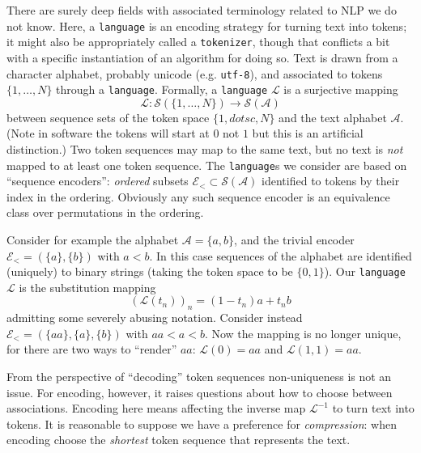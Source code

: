 \documentclass[11pt, oneside]{amsart}   	%
\begin{document}
There are surely deep fields with associated terminology related to NLP we do not know. Here, a \texttt{language} is an encoding strategy for turning text into tokens; it might also be appropriately called a \texttt{tokenizer}, though that conflicts a bit with a specific instantiation of an algorithm for doing so. Text is drawn from a character alphabet, probably unicode (e.g. \texttt{utf-8}), and associated to tokens $\{1,\dotsc,N\}$ through a \texttt{language}. Formally, a \texttt{language} $\mathcal{L}$ is a surjective mapping
\begin{equation*}
	\mathcal{L} : \mathcal{S}(\{1,\dotsc,N\}) \to \mathcal{S}(\mathcal{A})
\end{equation*}
between sequence sets of the token space $\{1,dotsc,N\}$ and the text alphabet $\mathcal{A}$. (Note in software the tokens will start at $0$ not $1$ but this is an artificial distinction.) Two token sequences may map to the same text, but no text is {\em not} mapped to at least one token sequence. The \texttt{language}s we consider are based on ``sequence encoders'': {\em ordered} subsets $\mathcal{E}_{<} \subset \mathcal{S}(\mathcal{A})$ identified to tokens by their index in the ordering. Obviously any such sequence encoder is an equivalence class over permutations in the ordering. 

Consider for example the alphabet $\mathcal{A} = \{a, b\}$, and the trivial encoder $\mathcal{E}_{<} = (\{a\},\{b\})$ with $a < b$. In this case sequences of the alphabet are identified (uniquely) to binary strings (taking the token space to be $\{0,1\}$). Our \texttt{language} $\mathcal{L}$ is the substitution mapping
\begin{equation*}
	(\mathcal{L}(t_n))_n = (1-t_n)a + t_nb
\end{equation*}
admitting some severely abusing notation. Consider instead $\mathcal{E}_{<} = (\{aa\},\{a\},\{b\})$ with $aa < a < b$. Now the mapping is no longer unique, for there are two ways to ``render'' $aa$: $\mathcal{L}(0) = aa$ and $\mathcal{L}(1,1) = aa$. 

From the perspective of ``decoding'' token sequences non-uniqueness is not an issue. For encoding, however, it raises questions about how to choose between associations. Encoding here means affecting the inverse map $\mathcal{L}^{-1}$ to turn text into tokens. It is reasonable to suppose we have a preference for {\em compression}: when encoding choose the {\em shortest} token sequence that represents the text. 
\end{document}
